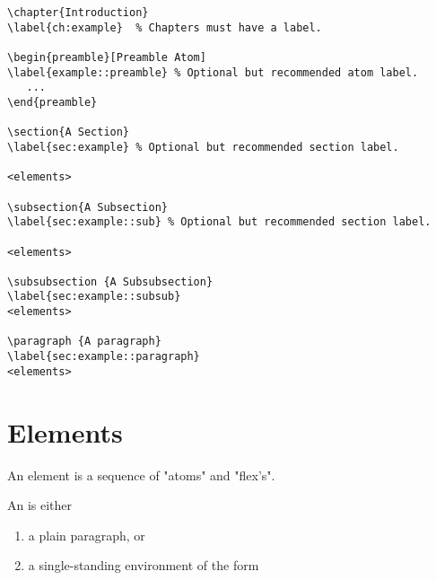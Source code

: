 \begin{example}
\begin{lstlisting}
\chapter{Introduction}
\label{ch:example}  % Chapters must have a label.
   
\begin{preamble}[Preamble Atom]
\label{example::preamble} % Optional but recommended atom label.
   ...
\end{preamble}

\section{A Section}
\label{sec:example} % Optional but recommended section label.   

<elements>

\subsection{A Subsection}
\label{sec:example::sub} % Optional but recommended section label.   

<elements>

\subsubsection {A Subsubsection}
\label{sec:example::subsub}
<elements>

\paragraph {A paragraph}
\label{sec:example::paragraph}
<elements>

\end{lstlisting}


\section{Elements}

An element is a sequence of "atoms" and "flex's".


\begin{definition}[Atoms]
An  is either
\begin{enumerate}
\item a plain paragraph, or
\item a single-standing environment of the form


\end{enumerate}
\end{definition}
\end{example}
